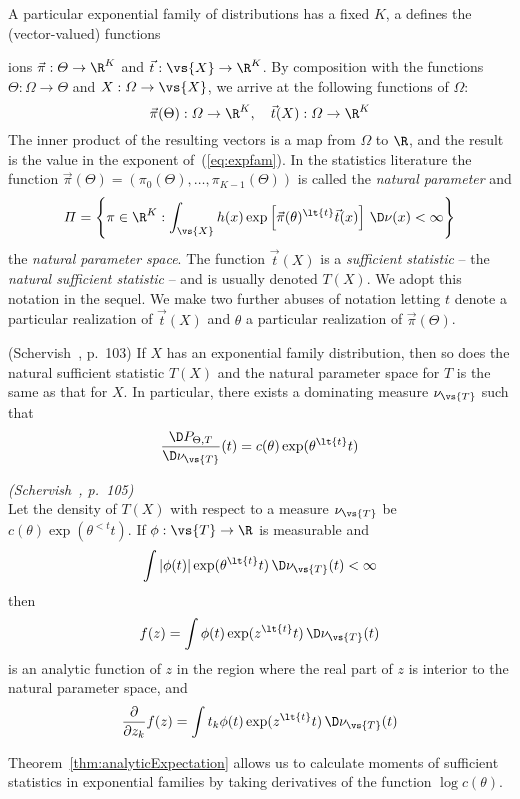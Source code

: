 A particular exponential family of distributions has a
fixed $K$, a defines the (vector-valued) functions{ions
$\vec{\pi}: \varTheta \to
\R^K$ and 
$\vec{t}: \vs{X} \to \R^K$.
By composition with the functions $\varTheta:\varOmega
\to \varTheta$ and $X: \varOmega \to \vs{X}$,
we arrive at the following functions of $\varOmega$:
\[
\vec{\pi}(\Theta):\varOmega \to \R^K, \quad 
\vec{t}(X): \varOmega \to \R^K
\]
The inner product of the resulting vectors is a map from
$\varOmega$ to $\R$, and the result is the value in the
exponent of~(\ref{eq:expfam}). 
In the statistics literature the function
$\vec{\pi}(\Theta) = (\pi_0(\Theta), \ldots, \pi_{K-1}(\Theta))$
is called the {\it natural parameter} and 
\[
\varPi = \left\{\pi \in \R^K : 
\int_{\vs{X}}
  h(x)\exp\left[\vec{\pi}(\theta)^{\lt{t}}\vec{t}(x)\right]
  \, \D \nu(x) < \infty
        \right\}
\]
the {\it natural parameter space}.
The function $\vec{t}(X)$ is a {\it sufficient statistic} --
the {\it natural sufficient statistic} -- and is usually
denoted $T(X)$.  We adopt this notation in the sequel. 
We make two further abuses of notation letting $t$ denote a
particular realization of $\vec{t}(X)$ and $\theta$ a
particular realization of $\vec{\pi}(\Theta)$. 


\begin{lemma}\label{lem:suffStatDist}
(Schervish~\cite{Schervish:1995}, p.~103)
If $X$ has an exponential family distribution, then so does
the natural sufficient statistic 
$T(X)$ and the natural parameter space for $T$ is the same
as that for $X$. In particular, there exists a dominating
measure $\nu_{\vs{T}}$ such that 
\[
\frac{\D P_{\Theta,T}}{\D \nu_{\vs{T}}}(t) =
c(\theta)\exp(\theta^{\lt{t}}t)
\]
\end{lemma}
\begin{theorem}%
\label{thm:analyticExpectation}
\emph{(Schervish~\cite{Schervish:1995}, p.~105)}\\
Let the density of
$T(X)$ with respect to a measure $\nu_{\vs{T}}$ be 
$c(\theta)\exp(\theta^{\lt{t}}t)$. 
If $\phi:\vs{T}\to \R$ is measurable and 
\[
\int |\phi(t)|\exp(\theta^{\lt{t}}t) \,\D \nu_{\vs{T}}(t)
< \infty
\]
then 
\[
f(z) = \int \phi(t)\exp(z^{\lt{t}}t) \,\D \nu_{\vs{T}}(t)
\]
is an analytic function of $z$  in the region where the real
part of $z$ is interior to the natural parameter space, and 
\[
\frac{\partial}{\partial z_k} f(z) = 
\int t_k \phi(t)\exp(z^{\lt{t}}t) \,\D \nu_{\vs{T}}(t)
\]
\end{theorem}
Theorem~\ref{thm:analyticExpectation} allows us to calculate
moments of sufficient statistics in exponential families by
taking derivatives of the function $\log c(\theta)$.

}
